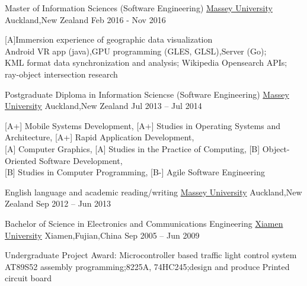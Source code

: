 
\begin{cventries}
\cventry
{Master of Information Sciences (Software Engineering)}
{\href{http://www.massey.ac.nz/}{Massey University}}
{Auckland,\enskip New Zealand}
{Feb 2016 - Nov 2016}
{
	\begin{cvitems}
		\item {[A]Immersion experience of geographic data visualization\\
			Android VR app (java),\enskip GPU programming (GLES, GLSL),\enskip Server (Go);\\
			KML format data synchronization and analysis;\enskip 
			Wikipedia Opensearch APIs;\enskip 
			ray-object intersection research}
	\end{cvitems}
}
\end{cventries}

\begin{cventries}
	\cventry
	{Postgraduate Diploma in Information Sciencse (Software Engineering)}
	{\href{http://www.massey.ac.nz/}{Massey University}}
	{Auckland,\enskip New Zealand}
	{Jul 2013 – Jul 2014}
	{
		\begin{cvitems}
			\item{[A+] Mobile Systems Development},\enskip
			{[A+] Studies in Operating Systems and Architecture},\enskip
			{[A+] Rapid Application Development},\\
			{[A] Computer Graphics},\enskip
			{[A] Studies in the Practice of Computing},\enskip
			{[B] Object-Oriented Software Development},\\
			{[B] Studies in Computer Programming},\enskip
			{[B-] Agile Software Engineering}
		\end{cvitems}
	}
\end{cventries}

\begin{cventries}
	\cventry
	{English language and academic reading/writing}
	{\href{http://www.massey.ac.nz/}{Massey University}}
	{Auckland,\enskip New Zealand}
	{Sep 2012 – Jun 2013}
	{
		\begin{cvitems}
		\end{cvitems}
	}
\end{cventries}

\begin{cventries}
	\cventry
	{Bachelor of Science in Electronics and Communications Engineering}
	{\href{http://www.xmu.edu.cn/en/}{Xiamen University}}
	{Xiamen,\enskip Fujian,\enskip China}
	{Sep 2005 – Jun 2009}
	{
		\begin{cvitems}
			\item {Undergraduate Project Award: Microcontroller based traffic light control system\\
			AT89S52 assembly programming;\enskip 8225A, 74HC245;\enskip design and produce Printed circuit board}
		\end{cvitems}
	}
\end{cventries}

